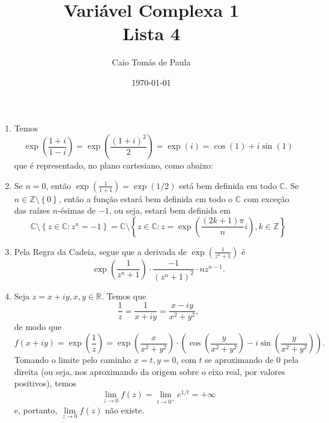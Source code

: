 \documentclass[12pt,a4paper]{article}
\title{\textbf{Variável Complexa 1}\\ Lista 4}
\author{Caio Tomás de Paula}
\date{\today}
\begin{document}
	\maketitle
	\begin{enumerate}
		\item Temos
		$$
		\exp\left( \frac{1+i}{1-i} \right) = \exp\left( \frac{(1+i)^2}{2} \right) = \exp(i) = \cos(1) + i\sin(1)
		$$
		que é representado, no plano cartesiano, como abaixo:
		
		\begin{figure}[h!]
			\centering 
		\end{figure}
		
		\item Se $n=0$, então $\displaystyle{ \exp\left( \frac{1}{1+1} \right) = \exp(1/2) }$ está bem definida em todo $\mathbb{C}$. Se $n\in\mathbb{Z}\setminus\left\{0\right\}$, então a função estará bem definida em todo o $\mathbb{C}$ com exceção das raízes $n$-ésimas de $-1$, ou seja, estará bem definida em
		$$
		\mathbb{C}\setminus\left\{ z\in\mathbb{C} : z^n = -1 \right\} = \mathbb{C}\setminus\left\{ z\in\mathbb{C} : z = \exp\left( \frac{(2k+1)\pi}{n}i \right), k\in\mathbb{Z}  \right\}
		$$
		
		\item Pela Regra da Cadeia, segue que a derivada de $\displaystyle{ \exp\left( \frac{1}{z^n+1} \right) }$ é
		$$
		\exp\left( \frac{1}{z^n + 1} \right)\cdot\frac{-1}{(z^n+1)^2}\cdot nz^{n-1}.
		$$
		
		\item Seja $z = x+iy, x,y\in\mathbb{R}$. Temos que
		$$
		\frac{1}{z} = \frac{1}{x+iy} = \frac{x-iy}{x^2+y^2},
		$$
		de modo que
		$$
		f(x+iy) = \exp\left( \frac{1}{z} \right) = \exp\left(\frac{x}{x^2+y^2}\right)\cdot \left( \cos\left( \frac{y}{x^2+y^2}\right) - i\sin\left( \frac{y}{x^2+y^2}\right) \right).
		$$
		Tomando o limite pelo caminho $x = t, y = 0$, com $t$ se aproximando de $0$ pela direita (ou seja, nos aproximando da origem sobre o eixo real, por valores positivos), temos
		$$
		\lim\limits_{z\to 0}f(z) = \lim\limits_{t\to 0^{+}}e^{1/t} = +\infty
		$$
		e, portanto, $\displaystyle{\lim\limits_{z\to 0}f(z)}$ não existe.
		

\end{enumerate}
\end{document}
